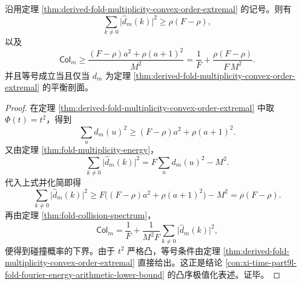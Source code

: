 \begin{corollary}\label{cor:derived-fold-multiplicity-fourier-collision-floor}
沿用定理 \ref{thm:derived-fold-multiplicity-convex-order-extremal} 的记号。则有
\[
\sum_{k\ne 0}\bigl|\widehat d_m(k)\bigr|^2
\ge
\rho(F-\rho),
\]
以及
\[
\mathsf{Col}_m
\ge
\frac{(F-\rho)a^2+\rho(a+1)^2}{M^2}
=
\frac1F+\frac{\rho(F-\rho)}{F\,M^2}.
\]
并且等号成立当且仅当 \(d_m\) 为定理 \ref{thm:derived-fold-multiplicity-convex-order-extremal} 的平衡剖面。
\end{corollary}
\begin{proof}
在定理 \ref{thm:derived-fold-multiplicity-convex-order-extremal} 中取 \(\Phi(t)=t^2\)，得到
\[
\sum_{u}d_m(u)^2
\ge
(F-\rho)a^2+\rho(a+1)^2.
\]
又由定理 \ref{thm:fold-multiplicity-energy}，
\[
\sum_{k\ne 0}\bigl|\widehat d_m(k)\bigr|^2
=
F\sum_u d_m(u)^2-M^2.
\]
代入上式并化简即得
\[
\sum_{k\ne 0}\bigl|\widehat d_m(k)\bigr|^2
\ge
F\bigl((F-\rho)a^2+\rho(a+1)^2\bigr)-M^2
=
\rho(F-\rho).
\]
再由定理 \ref{thm:fold-collision-spectrum}，
\[
\mathsf{Col}_m
=
\frac1F+\frac{1}{M^2F}\sum_{k\ne 0}\bigl|\widehat d_m(k)\bigr|^2,
\]
便得到碰撞概率的下界。由于 \(t^2\) 严格凸，等号条件由定理 \ref{thm:derived-fold-multiplicity-convex-order-extremal} 直接给出。这正是结论 \ref{con:xi-time-part9l-fold-fourier-energy-arithmetic-lower-bound} 的凸序极值化表述。证毕。
\end{proof}

